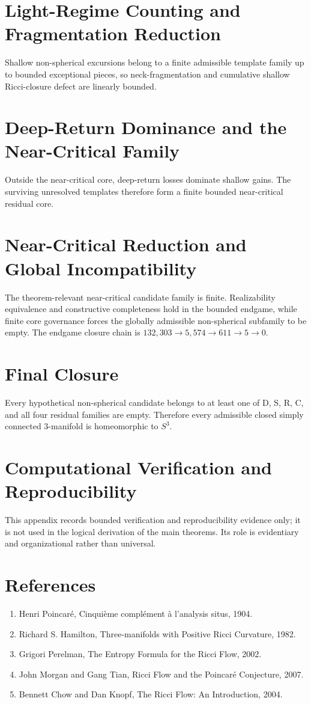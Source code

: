 \documentclass[11pt,a4paper]{article}
\begin{document}
\section{Light-Regime Counting and Fragmentation Reduction}
Shallow non-spherical excursions belong to a finite admissible template family up to bounded exceptional pieces, so neck-fragmentation and cumulative shallow Ricci-closure defect are linearly bounded.

\section{Deep-Return Dominance and the Near-Critical Family}
Outside the near-critical core, deep-return losses dominate shallow gains. The surviving unresolved templates therefore form a finite bounded near-critical residual core.

\section{Near-Critical Reduction and Global Incompatibility}
The theorem-relevant near-critical candidate family is finite. Realizability equivalence and constructive completeness hold in the bounded endgame, while finite core governance forces the globally admissible non-spherical subfamily to be empty. The endgame closure chain is \(132{,}303 \to 5{,}574 \to 611 \to 5 \to 0\).

\section{Final Closure}
Every hypothetical non-spherical candidate belongs to at least one of D, S, R, C, and all four residual families are empty. Therefore every admissible closed simply connected 3-manifold is homeomorphic to \(S^3\).

\appendix
\section{Computational Verification and Reproducibility}
This appendix records bounded verification and reproducibility evidence only; it is not used in the logical derivation of the main theorems. Its role is evidentiary and organizational rather than universal.

\section{References}
\begin{enumerate}
    \item Henri Poincar\'e, Cinqui\`eme compl\'ement \`a l'analysis situs, 1904.
    \item Richard S. Hamilton, Three-manifolds with Positive Ricci Curvature, 1982.
    \item Grigori Perelman, The Entropy Formula for the Ricci Flow, 2002.
    \item John Morgan and Gang Tian, Ricci Flow and the Poincar\'e Conjecture, 2007.
    \item Bennett Chow and Dan Knopf, The Ricci Flow: An Introduction, 2004.
\end{enumerate}
\end{document}
